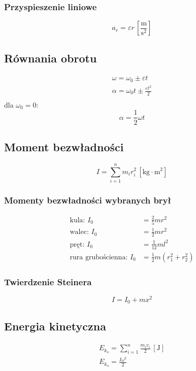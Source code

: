 \documentclass{article}
\numberwithin{equation}{section}
\newcommand{\unit}[1]{\, \left[\mathrm{#1}\right]}
\begin{document}
      \subsubsection{Przyspieszenie liniowe}
        \begin{equation}
          a_r = \varepsilon r \unit{\frac{m}{s^2}}
        \end{equation}
      \subsection{Równania obrotu}
        \begin{gather}
          \omega = \omega_0 \pm \varepsilon t\\
          \alpha = \omega_0t \pm \frac{\varepsilon t^2}{2}\\
        \end{gather}
        dla $\omega_0 = 0$:
        \begin{equation}
          \alpha = \frac{1}{2} \omega t
        \end{equation}
    \subsection{Moment bezwładności}
      \begin{equation}
        I = \sum_{i=1}^n m_ir_i^2 \unit{kg\cdot m^2}
      \end{equation}
      \subsubsection{Momenty bezwładności wybranych brył}
        \begin{align}
          \text{kula: } I_0 &= \frac{2}{5}mr^2\\
          \text{walec: } I_0 &= \frac{1}{2}mr^2\\
          \text{pręt: } I_0 &= \frac{1}{12}ml^2\\
          \text{rura grubościenna: } I_0 &= \frac{1}{2}m(r_1^2 + r_2^2)
        \end{align}
      \subsubsection{Twierdzenie Steinera}
        \begin{equation}
          I = I_0 +mx^2
        \end{equation}
    \subsection{Energia kinetyczna}
      \begin{gather}
        E_{k_o} = \sum_{i=1}^n \frac{m_iv_i}{2} \unit{J}\\
        E_{k_o} = \frac{I\omega^2}{2}
      \end{gather}
\end{document}
